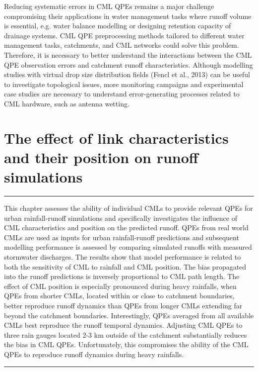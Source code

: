 \documentclass{ctuthesis}\usepackage[]{graphicx}\usepackage[]{color}
\begin{document}
Reducing systematic errors in CML QPEs remains a major challenge compromising their applications in water management tasks where runoff volume is essential, e.g. water balance modelling or designing retention capacity of drainage systems. CML QPE preprocessing methods tailored to different water management tasks, catchments, and CML networks could solve this problem. Therefore, it is necessary to better understand the interactions between the CML QPE observation errors and catchment runoff characteristics. Although modelling studies with virtual drop size distribution fields (Fencl et al., 2013) can be useful to investigate topological issues, more monitoring campaigns and experimental case studies are necessary to understand error-generating processes related to CML hardware, such as antenna wetting.





        
        


\chapter{The effect of link characteristics and their position on runoff simulations} \label{chap4}

\rule{\textwidth}{0.4pt}
This chapter assesses the ability of individual CMLs to provide relevant QPEs for urban rainfall-runoff simulations and specifically investigates the influence of CML characteristics and position on the predicted runoff. QPEs from real world CMLs are used as inputs for urban rainfall-runoff predictions and subsequent modelling performance is assessed by comparing simulated runoffs with measured stormwater discharges. The results show that model performance is related to both the sensitivity of CML to rainfall and CML position. The bias propagated into the runoff predictions is inversely proportional to CML path length. The effect of CML position is especially pronounced during heavy rainfalls, when QPEs from shorter CMLs, located within or close to catchment boundaries, better reproduce runoff dynamics than QPEs from longer CMLs extending far beyond the catchment boundaries. Interestingly, QPEs averaged from all available CMLs best reproduce the runoff temporal dynamics. Adjusting CML QPEs to three rain gauges located 2-3 km outside of the catchment substantially reduces the bias in CML QPEs. Unfortunately, this compromises the ability of the CML QPEs to reproduce runoff dynamics during heavy rainfalls.
\rule[0.2cm]{\textwidth}{0.4pt}
\end{document}
